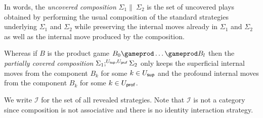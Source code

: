 In words, the \emph{uncovered composition}
$\Sigma_1 \|\ \Sigma_2$ is the set of uncovered plays obtained by performing the usual composition of the standard strategies underlying $\Sigma_1$ and $\Sigma_2$ while preserving the internal moves already in $\Sigma_1$ and $\Sigma_2$ as well as the internal move produced by the composition.

Whereas if $B$ is the product game $B_0
\gameprod \ldots \gameprod B_l$ then the \emph{partially covered composition}
$\Sigma_1 ;^{U_{\sf sup}, U_{\sf prof}} \Sigma_2$
only keeps the superficial internal moves from the component $B_k$ for some $k \in U_{\sf sup}$ and the profound internal moves from the component $B_k$ for some $k \in U_{\sf prof}$.


\smallskip

We write $\mathcal{I}$ for the set of all revealed strategies. Note
that $\mathcal{I}$ is not a category since composition is not
associative and there is no identity interaction strategy.


